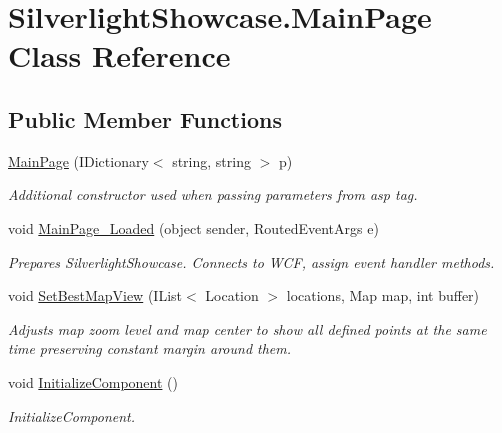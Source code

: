 \hypertarget{class_silverlight_showcase_1_1_main_page}{
\section{SilverlightShowcase.MainPage Class Reference}
\label{class_silverlight_showcase_1_1_main_page}
}
\subsection*{Public Member Functions}
\begin{DoxyCompactItemize}
\item 
\hyperlink{class_silverlight_showcase_1_1_main_page_ac85c02c58943a5ae1721a68ee44c7855}{MainPage} (IDictionary$<$ string, string $>$ p)
\begin{DoxyCompactList}\small\item\em Additional constructor used when passing parameters from asp tag. \item\end{DoxyCompactList}\item 
void \hyperlink{class_silverlight_showcase_1_1_main_page_a025641a94db81065183c64971ebda1fa}{MainPage\_\-Loaded} (object sender, RoutedEventArgs e)
\begin{DoxyCompactList}\small\item\em Prepares SilverlightShowcase. Connects to WCF, assign event handler methods. \item\end{DoxyCompactList}\item 
void \hyperlink{class_silverlight_showcase_1_1_main_page_a1a144be96215e9b7c44e305dd49af656}{SetBestMapView} (IList$<$ Location $>$ locations, Map map, int buffer)
\begin{DoxyCompactList}\small\item\em Adjusts map zoom level and map center to show all defined points at the same time preserving constant margin around them. \item\end{DoxyCompactList}\item 
void \hyperlink{class_silverlight_showcase_1_1_main_page_a92670f2bc7dcc80b9e95d52cdcdae7df}{InitializeComponent} ()
\begin{DoxyCompactList}\small\item\em InitializeComponent. \item\end{DoxyCompactList}\end{DoxyCompactItemize}


